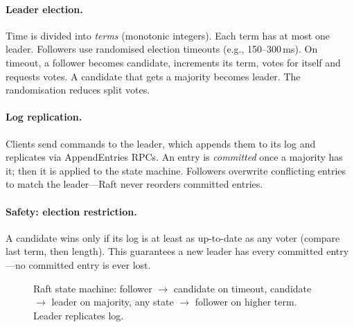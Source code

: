 \paragraph{Leader election.} Time is divided into \emph{terms} (monotonic integers). Each term has at most one leader. Followers use randomised election timeouts (e.g., 150--300\,ms). On timeout, a follower becomes candidate, increments its term, votes for itself and requests votes. A candidate that gets a majority becomes leader. The randomisation reduces split votes.

\paragraph{Log replication.} Clients send commands to the leader, which appends them to its log and replicates via AppendEntries RPCs. An entry is \emph{committed} once a majority has it; then it is applied to the state machine. Followers overwrite conflicting entries to match the leader---Raft never reorders committed entries.

\paragraph{Safety: election restriction.} A candidate wins only if its log is at least as up-to-date as any voter (compare last term, then length). This guarantees a new leader has every committed entry---no committed entry is ever lost.

\begin{figure}[h]
\centering
{}
\caption{Raft state machine: follower $\to$ candidate on timeout, candidate $\to$ leader on majority, any state $\to$ follower on higher term. Leader replicates log.}
\label{fig:raft-states}
\end{figure}

